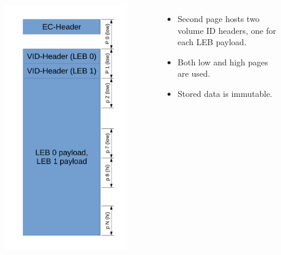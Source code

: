 \documentclass[aspectratio=169,obeyspaces,spaces,hyphens,dvipsnames]{beamer}
\begin{document}
\begin{frame}[fragile]
\begin{columns}
\begin{figure}
     \includegraphics[scale=0.33]{ubi_mlc_conso.pdf}
     \end{figure}
    \begin{itemize}
    \item Second page hosts two volume ID headers, one for each LEB payload.
    \item Both low and high pages are used.
    \item Stored data is immutable.
    \end{itemize}
   \end{columns}
\end{frame}
\end{document}
